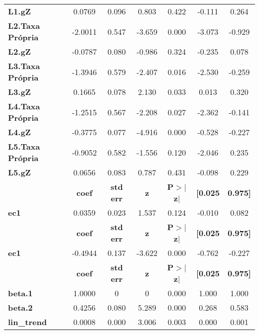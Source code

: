 \begin{center}
\begin{tabular}{lcccccc}
\textbf{L1.gZ}           &       0.0769  &        0.096     &     0.803  &         0.422        &       -0.111    &        0.264     \\
\textbf{L2.Taxa Própria} &      -2.0011  &        0.547     &    -3.659  &         0.000        &       -3.073    &       -0.929     \\
\textbf{L2.gZ}           &      -0.0787  &        0.080     &    -0.986  &         0.324        &       -0.235    &        0.078     \\
\textbf{L3.Taxa Própria} &      -1.3946  &        0.579     &    -2.407  &         0.016        &       -2.530    &       -0.259     \\
\textbf{L3.gZ}           &       0.1665  &        0.078     &     2.130  &         0.033        &        0.013    &        0.320     \\
\textbf{L4.Taxa Própria} &      -1.2515  &        0.567     &    -2.208  &         0.027        &       -2.362    &       -0.141     \\
\textbf{L4.gZ}           &      -0.3775  &        0.077     &    -4.916  &         0.000        &       -0.528    &       -0.227     \\
\textbf{L5.Taxa Própria} &      -0.9052  &        0.582     &    -1.556  &         0.120        &       -2.046    &        0.235     \\
\textbf{L5.gZ}           &       0.0656  &        0.083     &     0.787  &         0.431        &       -0.098    &        0.229     \\
             & \textbf{coef} & \textbf{std err} & \textbf{z} & \textbf{P$> |$z$|$} & \textbf{[0.025} & \textbf{0.975]}  \\
\midrule
\textbf{ec1} &       0.0359  &        0.023     &     1.537  &         0.124        &       -0.010    &        0.082     \\
             & \textbf{coef} & \textbf{std err} & \textbf{z} & \textbf{P$> |$z$|$} & \textbf{[0.025} & \textbf{0.975]}  \\
\midrule
\textbf{ec1} &      -0.4944  &        0.137     &    -3.622  &         0.000        &       -0.762    &       -0.227     \\
                    & \textbf{coef} & \textbf{std err} & \textbf{z} & \textbf{P$> |$z$|$} & \textbf{[0.025} & \textbf{0.975]}  \\
\midrule
\textbf{beta.1}     &       1.0000  &            0     &         0  &         0.000        &        1.000    &        1.000     \\
\textbf{beta.2}     &       0.4256  &        0.080     &     5.289  &         0.000        &        0.268    &        0.583     \\
\textbf{lin\_trend} &       0.0008  &        0.000     &     3.006  &         0.003        &        0.000    &        0.001     \\
\bottomrule
\end{tabular}
\end{center}